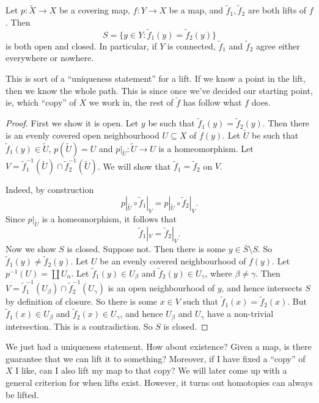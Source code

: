 \documentclass[a4paper]{article}
\begin{document}
\begin{lemma}
  Let $p: \tilde{X} \to X$ be a covering map, $f: Y\to X$ be a map, and $\tilde{f}_1 ,\tilde{f}_2$ are both lifts of $f$. Then
  \[
    S = \{y\in Y: \tilde{f}_1(y) = \tilde{f}_2(y)\}
  \]
  is both open and closed. In particular, if $Y$ is connected, $\tilde{f}_1$ and $\tilde{f}_2$ agree either everywhere or nowhere.
\end{lemma}
This is sort of a ``uniqueness statement'' for a lift. If we know a point in the lift, then we know the whole path. This is since once we've decided our starting point, ie, which ``copy'' of $X$ we work in, the rest of $\tilde{f}$ has follow what $f$ does.

\begin{proof}
  First we show it is open. Let $y$ be such that $\tilde{f}_1(y) = \tilde{f}_2(y)$. Then there is an evenly covered open neighbourhood $U \subseteq X$ of $f(y)$. Let $\tilde{U}$ be such that $\tilde{f}_1(y) \in \tilde{U}$, $p(\tilde{U}) = U$ and $p|_{\tilde{U}} : \tilde{U} \to U$ is a homeomorphism. Let $V = \tilde{f}_1^{-1}(\tilde{U}) \cap \tilde{f}_2^{-1}(\tilde{U})$. We will show that $\tilde{f}_1 = \tilde{f}_2$ on $V$.

  Indeed, by construction
  \[
    p|_{\tilde{U}} \circ \tilde{f}_1|_V = p|_{\tilde{U}} \circ \tilde{f}_2|_V.
  \]
  Since $p|_{\tilde{U}}$ is a homeomorphism, it follows that
  \[
    \tilde{f}_1|_V = \tilde{f}_2|_V.
  \]
  Now we show $S$ is closed. Suppose not. Then there is some $y \in \bar{S} \setminus S$. So $\tilde{f}_1(y) \not= \tilde{f}_2(y)$. Let $U$ be an evenly covered neighbourhood of $f(y)$. Let $p^{-1}(U) = \coprod U_\alpha$. Let $\tilde{f}_1(y) \in U_\beta$ and $\tilde{f}_2(y) \in U_\gamma$, where $\beta \not= \gamma$. Then $V = \tilde{f}_1^{-1}(U_\beta) \cap \tilde{f}_2^{-1}(U_\gamma)$ is an open neighbourhood of $y$, and hence intersects $S$ by definition of closure. So there is some $x \in V$ such that $\tilde{f}_1(x) = \tilde{f}_2(x)$. But $\tilde{f}_1(x) \in U_\beta$ and $\tilde{f}_2(x) \in U_\gamma$, and hence $U_\beta$ and $U_\gamma$ have a non-trivial intersection. This is a contradiction. So $S$ is closed.
\end{proof}

We just had a uniqueness statement. How about existence? Given a map, is there guarantee that we can lift it to something? Moreover, if I have fixed a ``copy'' of $X$ I like, can I also lift my map to that copy? We will later come up with a general criterion for when lifts exist. However, it turns out homotopies can always be lifted.
\end{document}
